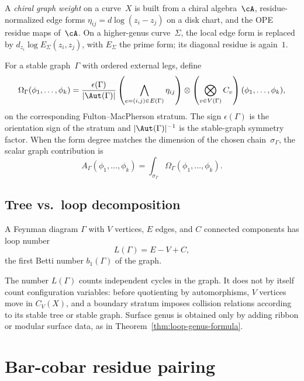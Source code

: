 \begin{definition}
\label{def:chiral-graph-weights}
A \emph{chiral graph weight} on a curve~$X$ is built from a chiral
algebra~$\cA$, residue-normalized edge forms
\(\eta_{ij}=d\log(z_i-z_j)\) on a disk chart, and the OPE residue maps
of~\(\cA\).  On a higher-genus curve~\(\Sigma\), the local edge form is
replaced by \(d_{z_i}\log E_\Sigma(z_i,z_j)\), with \(E_\Sigma\) the
prime form; its diagonal residue is again~\(1\).

For a stable graph~\(\Gamma\) with ordered external legs, define
\[
\Omega_\Gamma(\phi_1,\ldots,\phi_k)
=\frac{\epsilon(\Gamma)}{|\Aut(\Gamma)|}
\left(\bigwedge_{e=(i,j)\in E(\Gamma)}\eta_{ij}\right)
\otimes
\left(\bigotimes_{v\in V(\Gamma)}C_v\right)(\phi_1,\ldots,\phi_k),
\]
on the corresponding Fulton--MacPherson stratum.  The sign
\(\epsilon(\Gamma)\) is the orientation sign of the stratum and
\(|\Aut(\Gamma)|^{-1}\) is the stable-graph symmetry factor.  When the
form degree matches the dimension of the chosen chain~\(\sigma_\Gamma\),
the scalar graph contribution is
\[
A_\Gamma(\phi_1,\ldots,\phi_k)
=\int_{\sigma_\Gamma}\Omega_\Gamma(\phi_1,\ldots,\phi_k).
\]
\end{definition}

\subsection{Tree vs.\ loop decomposition}

\begin{definition}
A Feynman diagram $\Gamma$ with $V$ vertices, $E$ edges, and $C$ connected
components has loop number
\[L(\Gamma) = E - V + C,\]
the first Betti number $b_1(\Gamma)$ of the graph.
\end{definition}

\begin{remark}
The number \(L(\Gamma)\) counts independent cycles in the graph.  It
does not by itself count configuration variables: before quotienting by
automorphisms, \(V\) vertices move in \(C_V(X)\), and a boundary stratum
imposes collision relations according to its stable tree or stable
graph.  Surface genus is obtained only by adding ribbon or modular
surface data, as in Theorem~\ref{thm:loop-genus-formula}.
\end{remark}

\section{Bar-cobar residue pairing}

